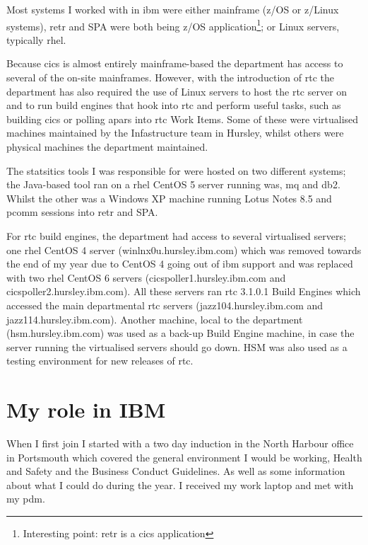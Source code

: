 \documentclass[a4paper,11pt]{report}
\begin{document}
Most systems I worked with in \gls{ibm} were either mainframe (z/OS or z/Linux systems), \gls{retr}
and SPA were both being z/OS application\footnote{Interesting point: \gls{retr} is a \gls{cics} 
application}; or Linux servers, typically \gls{rhel}.

Because \gls{cics} is almost entirely mainframe-based the department has access to several of the
on-site mainframes. However, with the introduction of \gls{rtc} the department has also required
the use of Linux servers to host the \gls{rtc} server on and to run build engines that hook into
\gls{rtc} and perform useful tasks, such as building \gls{cics} or polling \gls{apar}s into 
\gls{rtc} Work Items. Some of these were virtualised machines maintained by the Infastructure team
in Hursley, whilst others were physical machines the department maintained.

The statsitics tools I was responsible for were hosted on two different systems; the Java-based
tool ran on a \gls{rhel} CentOS 5 server running \gls{was}, \gls{mq} and \gls{db2}. Whilst the 
other was a Windows XP machine running Lotus Notes 8.5 and \gls{pcomm} sessions into \gls{retr} and
SPA.

For \gls{rtc} build engines, the department had access to several virtualised servers; one 
\gls{rhel} CentOS 4 server (winlnx0u.hursley.ibm.com) which was removed towards the end of my year
due to CentOS 4 going out of \gls{ibm} support and was replaced with two \gls{rhel} CentOS 6 
servers (cicspoller1.hursley.ibm.com and cicspoller2.hursley.ibm.com). All these servers ran 
\gls{rtc} 3.1.0.1 Build Engines which accessed the main departmental \gls{rtc} servers
(jazz104.hursley.ibm.com and jazz114.hursley.ibm.com). Another machine, local to the department
(hsm.hursley.ibm.com) was used as a back-up Build Engine machine, in case the server running the
virtualised servers should go down. HSM was also used as a testing environment for new releases of
\gls{rtc}.


\chapter{My role in IBM}

When I first join I started with a two day induction in the North Harbour office in Portsmouth 
which covered the general environment I would be working, Health and Safety and the Business 
Conduct Guidelines. As well as some information about what I could do during the year. I received
my work laptop and met with my \gls{pdm}.
\end{document}
